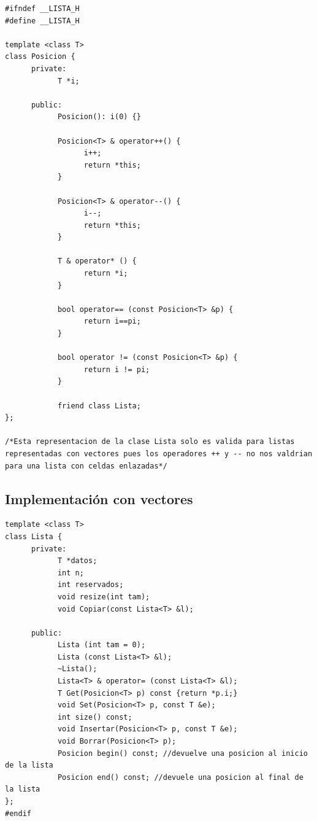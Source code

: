 \documentclass[10pt,a4paper,spanish]{report}
\begin{document}
\begin{verbatim}
#ifndef __LISTA_H
#define __LISTA_H

template <class T>
class Posicion {
      private:
            T *i;

      public:
            Posicion(): i(0) {}

            Posicion<T> & operator++() {
                  i++;
                  return *this;
            }

            Posicion<T> & operator--() {
                  i--;
                  return *this;
            }

            T & operator* () {
                  return *i;
            }

            bool operator== (const Posicion<T> &p) {
                  return i==pi;
            }

            bool operator != (const Posicion<T> &p) {
                  return i != pi;
            }

            friend class Lista;
};

/*Esta representacion de la clase Lista solo es valida para listas
representadas con vectores pues los operadores ++ y -- no nos valdrian
para una lista con celdas enlazadas*/
\end{verbatim}

\subsection{\textcolor[rgb]{0.2,0.5,0.5}Implementación con vectores}
\begin{verbatim}
template <class T>
class Lista {
      private:
            T *datos;
            int n;
            int reservados;
            void resize(int tam);
            void Copiar(const Lista<T> &l);

      public:
            Lista (int tam = 0);
            Lista (const Lista<T> &l);
            ~Lista();
            Lista<T> & operator= (const Lista<T> &l);
            T Get(Posicion<T> p) const {return *p.i;}
            void Set(Posicion<T> p, const T &e);
            int size() const;
            void Insertar(Posicion<T> p, const T &e);
            void Borrar(Posicion<T> p);
            Posicion begin() const; //devuelve una posicion al inicio de la lista
            Posicion end() const; //devuele una posicion al final de la lista
};
#endif
\end{verbatim}
\end{document}
